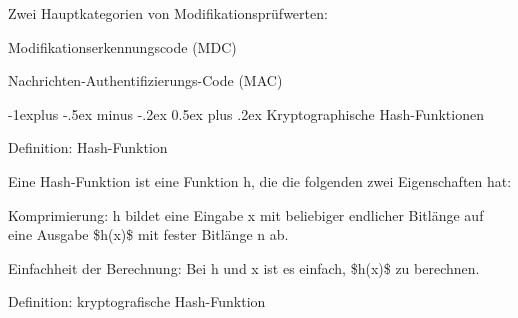 \documentclass[a4paper]{article}
\makeatletter
\renewcommand{\subsection}{\@startsection{subsection}{2}{0mm}%
 {-1explus -.5ex minus -.2ex}%
 {0.5ex plus .2ex}%
 {\normalfont\normalsize\bfseries}}
\makeatother
\begin{document}
\begin{multicols}{3}
\begin{itemize*}
            \begin{itemize*}
                  \item Zwei Hauptkategorien von Modifikationsprüfwerten:
                  \begin{itemize*} \item Modifikationserkennungscode (MDC) \item Nachrichten-Authentifizierungs-Code (MAC) \end{itemize*}
            \end{itemize*}
      \end{itemize*}


      \subsection{Kryptographische
            Hash-Funktionen}

      \begin{itemize*}
            \item
            Definition: Hash-Funktion

            \begin{itemize*}
                  \item Eine Hash-Funktion ist eine Funktion h, die die folgenden zwei Eigenschaften hat:
                  \begin{itemize*} \item Komprimierung: h bildet eine Eingabe x mit beliebiger endlicher Bitlänge auf eine Ausgabe \$h(x)\$ mit fester Bitlänge n ab. \item Einfachheit der Berechnung: Bei h und x ist es einfach, \$h(x)\$ zu berechnen. \end{itemize*}
            \end{itemize*}
            \item
            Definition: kryptografische Hash-Funktion


\end{itemize*}
\end{multicols}
\end{document}
